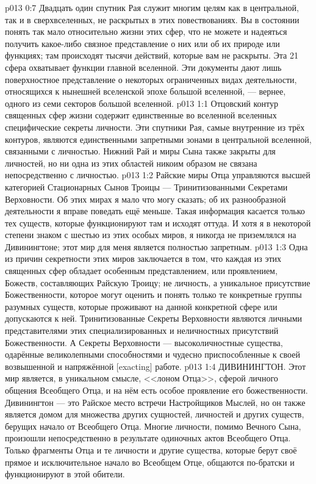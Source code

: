 \vs p013 0:7 Двадцать один спутник Рая служит многим целям как в центральной, так и в сверхвселенных, не раскрытых в этих повествованиях. Вы в состоянии понять так мало относительно жизни этих сфер, что не можете и надеяться получить какое\hyp{}либо связное представление о них или об их природе или функциях; там происходят тысячи действий, которые вам не раскрыты. Эта 21 сфера охватывает  функции главной вселенной. Эти документы дают лишь поверхностное представление о некоторых ограниченных видах деятельности, относящихся к нынешней вселенской эпохе большой вселенной, --- вернее, одного из семи секторов большой вселенной.
\vs p013 1:1 Отцовский контур священных сфер жизни содержит единственные во вселенной вселенных специфические секреты личности. Эти спутники Рая, самые внутренние из трёх контуров, являются единственными запретными зонами в центральной вселенной, связанными с личностью. Нижний Рай и миры Сына также закрыты для личностей, но ни одна из этих областей никоим образом не связана непосредственно с личностью.
\vs p013 1:2 Райские миры Отца управляются высшей категорией Стационарных Сынов Троицы --- Тринитизованными Секретами Верховности. Об этих мирах я мало что могу сказать; об их разнообразной деятельности я вправе поведать ещё меньше. Такая информация касается только тех существ, которые функционируют там и исходят оттуда. И хотя я в некоторой степени знаком с шестью из этих особых миров, я никогда не приземлялся на Дивинингтоне; этот мир для меня является полностью запретным.
\vs p013 1:3 Одна из причин секретности этих миров заключается в том, что каждая из этих священных сфер обладает особенным представлением, или проявлением, Божеств, составляющих Райскую Троицу; не личность, а уникальное присутствие Божественности, которое могут оценить и понять только те конкретные группы разумных существ, которые проживают на данной конкретной сфере или допускаются к ней. Тринитизованные Секреты Верховности являются личными представителями этих специализированных и неличностных присутствий Божественности. А Секреты Верховности --- высоколичностные существа, одарённые великолепными способностями и чудесно приспособленные к своей возвышенной и напряжённой [exacting] работе.
\vs p013 1:4 ДИВИНИНГТОН. Этот мир является, в уникальном смысле, <<лоном Отца>>, сферой личного общения Всеобщего Отца, и на нём есть особое проявление его божественности. Дивинингтон --- это Райское место встречи Настройщиков Мыслей, но он также является домом для множества других сущностей, личностей и других существ, берущих начало от Всеобщего Отца. Многие личности, помимо Вечного Сына, произошли непосредственно в результате одиночных актов Всеобщего Отца. Только фрагменты Отца и те личности и другие существа, которые берут своё прямое и исключительное начало во Всеобщем Отце, общаются по\hyp{}братски и функционируют в этой обители.
